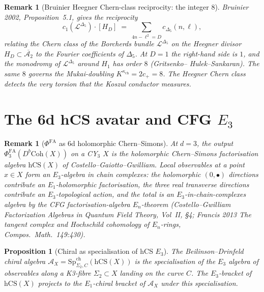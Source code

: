 \documentclass[11pt]{article}
\newtheorem{proposition}[theorem]{Proposition}
\newtheorem{remark}[theorem]{Remark}
\newcommand{\cA}{\mathcal{A}}
\newcommand{\cL}{\mathcal{L}}
\newcommand{\Coh}{\mathrm{Coh}}
\newcommand{\hCS}{\mathrm{hCS}}
\begin{document}
\begin{remark}[Bruinier Heegner Chern-class reciprocity: the integer 8]
\label{rem:bruinier-heegner-chern}
Bruinier 2002, Proposition~5.1, gives the reciprocity
\[
  c_1(\cL^{\Delta_5})\cdot[H_D]
  \;=\;
  \sum_{4n-\ell^2=D}c_{\Delta_5}(n,\ell),
\]
relating the Chern class of the Borcherds bundle $\cL^{\Delta_5}$ on the
Heegner divisor $H_D\subset\overline{\cA_2}$ to the Fourier
coefficients of $\Delta_5$. At $D=1$ the right-hand side is $1$, and
the monodromy of $\cL^{\Delta_5}$ around $H_1$ has order $8$ (Gritsenko--
Hulek--Sankaran). The same $8$ governs the Mukai-doubling
$K^{\kappa_{\mathrm{ch}}}=2c_+=8$. The
Heegner Chern class detects the very torsion that the Koszul conductor
measures.
\end{remark}

\section{The 6d hCS avatar and CFG $E_3$}
\label{sec:hCS-avatar}

\begin{remark}[$\Phi^{\mathrm{FA}}$ as 6d holomorphic Chern--Simons]
\label{rem:phi-fa-hCS}
At $d=3$, the output $\Phi^{\mathrm{FA}}_3(D^b\Coh(X))$ on a CY$_3$ $X$
is the holomorphic Chern--Simons factorisation algebra $\hCS(X)$
of Costello--Gaiotto--Gwilliam. Local observables at a point $x\in X$
form an $E_3$-algebra in chain complexes: the holomorphic $(0,\bullet)$
directions contribute an $E_1$-holomorphic factorisation, the three
real transverse directions contribute an $E_3$-topological action, and
the total is an $E_3$-in-chain-complexes algebra by the CFG
factorisation-algebra $E_n$-theorem (Costello--Gwilliam
\emph{Factorization Algebras in Quantum Field Theory}, Vol~II, \S 4;
Francis 2013 \emph{The tangent complex and Hochschild cohomology of
$E_n$-rings}, Compos.~Math.~149:430).
\end{remark}

\begin{proposition}[Chiral as specialisation of hCS $E_3$]
\label{prop:chiral-spec-hCS}
The Beilinson--Drinfeld chiral algebra
$\cA_X=\mathrm{Sp}^{\mathrm{ch}}_{\Sigma_2,C}(\hCS(X))$ is the
specialisation of the $E_3$ algebra of observables along a K3-fibre
$\Sigma_2\subset X$ landing on the curve $C$. The $E_3$-bracket of
$\hCS(X)$ projects to the $E_1$-chiral bracket of $\cA_X$ under this
specialisation.
\end{proposition}
\end{document}
